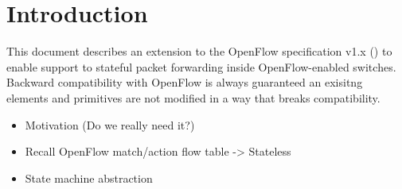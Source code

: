 
\chapter{Introduction}


This document describes an extension to the OpenFlow specification v1.x () to enable support to stateful packet forwarding inside OpenFlow-enabled switches. Backward compatibility with OpenFlow is always guaranteed an exisitng elements and primitives are not modified in a way that breaks compatibility.

\begin{itemize}
	\item Motivation (Do we really need it?)
	\item Recall OpenFlow match/action flow table -> Stateless
	\item State machine abstraction
\end{itemize}


